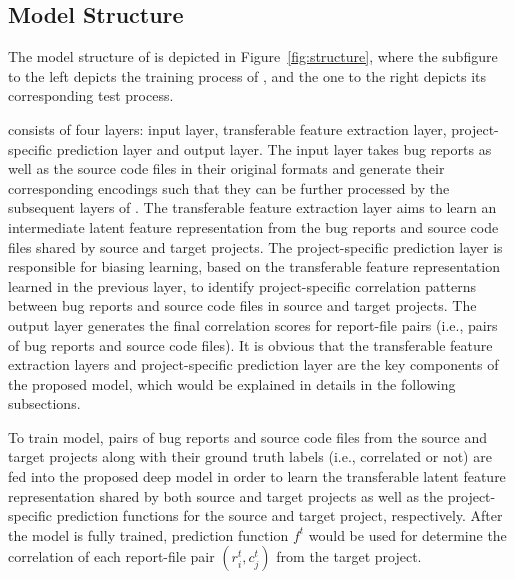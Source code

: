 \subsection{Model Structure}

The model structure of \TRANPCNN is depicted in Figure~\ref{fig:structure}, where the subfigure to the left depicts the training process of \TRANPCNN, and the one to the right depicts its corresponding test process.


\TRANPCNN consists of four layers: input layer, transferable feature extraction layer, project-specific prediction layer and output layer. The input layer takes bug reports as well as the source code files in their original formats and generate their corresponding encodings such that they can be further processed by the subsequent layers of \TRANPCNN. The transferable feature extraction layer aims to learn an intermediate latent feature representation from the bug reports and source code files shared by source and target projects.  The project-specific prediction layer is responsible for biasing learning, based on the transferable feature representation learned in the previous layer, to identify project-specific correlation patterns between bug reports and source code files in source and target projects. The output layer generates the final correlation scores for report-file pairs (i.e., pairs of bug reports and source code files). It is obvious that the transferable feature extraction layers and project-specific prediction layer are the key components of the proposed model, which would be explained in details in the following subsections. %


To train \TRANPCNN model, pairs of bug reports and source code files from the source and target projects along with their ground truth labels (i.e., correlated or not) are fed into the proposed deep model in order to learn the transferable latent feature representation shared by both source and target projects as well as the project-specific prediction functions for the source and target project, respectively. After the model is fully trained, prediction function $f^{t}$ would be used for determine the correlation of each report-file pair $(r_i^t, c_j^t)$ from the target project.

